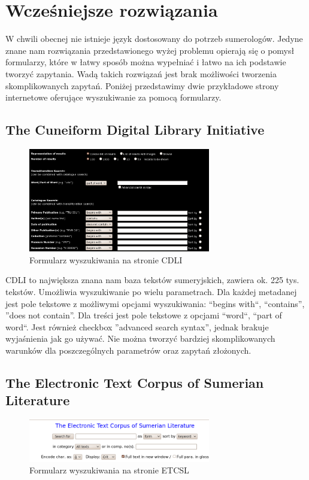 \chapter{Wcześniejsze rozwiązania}\label{r:losers}
W chwili obecnej nie istnieje język dostosowany do potrzeb sumerologów. Jedyne znane nam rozwiązania przedstawionego wyżej problemu opierają się o pomysł formularzy, które w łatwy sposób można wypełniać i łatwo na ich podstawie tworzyć zapytania. Wadą takich rozwiązań jest brak możliwości tworzenia skomplikowanych zapytań.
Poniżej przedstawimy dwie przykładowe strony internetowe oferujące wyszukiwanie za pomocą formularzy.
\section{The Cuneiform Digital Library Initiative \cite{cdli}}
\begin{figure}[h]
 \centering
 \includegraphics[width=300px]{../diagramy/cdli-search.png}
 \caption{Formularz wyszukiwania na stronie CDLI}
 \label{fig:cdli-search}
\end{figure}

CDLI to największa znana nam baza tekstów sumeryjskich, zawiera ok. 225 tys. tekstów. 
Umożliwia wyszukiwanie po wielu parametrach.
Dla każdej metadanej jest pole tekstowe z możliwymi opcjami wyszukiwania: ``begins with``, ``contains'', ''does not contain''. 
Dla treści jest pole tekstowe z opcjami ``word``, ``part of word``.
Jest również checkbox ''advanced search syntax'', jednak brakuje wyjaśnienia jak go używać.
Nie można tworzyć bardziej skomplikowanych warunków dla poszczególnych parametrów oraz zapytań złożonych.

\section{The Electronic Text Corpus of Sumerian Literature \cite{etcsl}} 
\begin{figure}[h]
 \centering
 \includegraphics[width=300px]{../diagramy/etcsl-search.png}
 \caption{Formularz wyszukiwania na stronie ETCSL}
 \label{fig:etcsl-search}
\end{figure}

